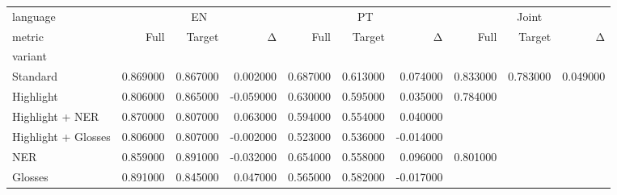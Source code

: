 \begin{tabular}{lrrrrrrrrr}
\toprule
language & \multicolumn{3}{c}{EN} & \multicolumn{3}{c}{PT} & \multicolumn{3}{c}{Joint} \\
metric & Full & Target & Δ & Full & Target & Δ & Full & Target & Δ \\
variant &  &  &  &  &  &  &  &  &  \\
\midrule
Standard & 0.869000 & 0.867000 & 0.002000 & 0.687000 & 0.613000 & 0.074000 & 0.833000 & 0.783000 & 0.049000 \\
Highlight & 0.806000 & 0.865000 & -0.059000 & 0.630000 & 0.595000 & 0.035000 & 0.784000 &  &  \\
Highlight + NER & 0.870000 & 0.807000 & 0.063000 & 0.594000 & 0.554000 & 0.040000 &  &  &  \\
Highlight + Glosses & 0.806000 & 0.807000 & -0.002000 & 0.523000 & 0.536000 & -0.014000 &  &  &  \\
NER & 0.859000 & 0.891000 & -0.032000 & 0.654000 & 0.558000 & 0.096000 & 0.801000 &  &  \\
Glosses & 0.891000 & 0.845000 & 0.047000 & 0.565000 & 0.582000 & -0.017000 &  &  &  \\
\bottomrule
\end{tabular}

